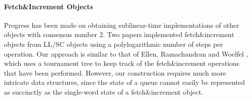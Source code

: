 \paragraph{Fetch\&Increment Objects}
Progress has been made on obtaining sublinear-time implementations of other objects 
with consensus number 2.
Two papers \cite{ERW12,10.1007/978-3-642-41527-2_20}
implemented fetch\&increment objects from LL/SC objects
using a polylogarithmic number of steps per operation.
Our approach is similar to that of Ellen, Ramachandran and Woelfel \cite{ERW12},
which uses a tournament tree to keep track of the fetch\&increment operations
that have been performed.  However, our construction requires much more intricate
data structures, since the state of a queue cannot easily be represented as succinctly
as the single-word state of a fetch\&increment object.



